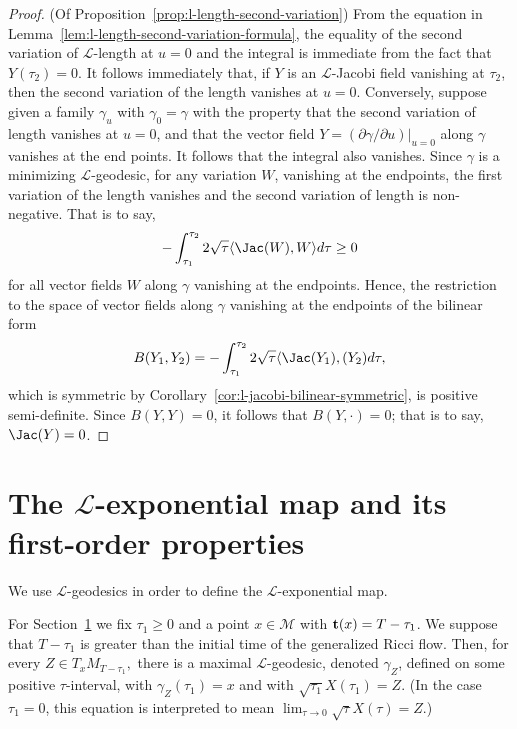 \begin{proof}(Of Proposition~\ref{prop:l-length-second-variation})
From the equation in Lemma~\ref{lem:l-length-second-variation-formula}, the equality of the second variation
of ${\mathcal L}$-length at $u=0$ and the integral is immediate from the fact
that $Y(\tau_2)=0$. It follows immediately that, if  $Y$ is an ${\mathcal
L}$-Jacobi field vanishing at $\tau_2$, then the second variation of the length
vanishes at $u=0$. Conversely, suppose given a family $\gamma_u$ with
$\gamma_0=\gamma$ with the property that the second variation of length
vanishes at $u=0$, and that the vector field $Y=(\partial\gamma/\partial
u)|_{u=0}$ along $\gamma$ vanishes at the end points. It follows that the
integral also vanishes. Since $\gamma$ is a minimizing ${\mathcal L}$-geodesic,
for any variation $W$, vanishing at the endpoints, the first variation of the
length vanishes and the second variation of length is non-negative. That is to
say,
$$-\int_{\tau_1}^{\tau_2}2\sqrt{\tau}\langle \Jac(W),W\rangle d\tau\ge 0$$
for all vector fields $W$ along $\gamma$ vanishing at the endpoints.
Hence, the restriction to the space of vector fields along $\gamma$
vanishing at the endpoints of the bilinear form
$$B(Y_1,Y_2)=-\int_{\tau_1}^{\tau_2}2\sqrt{\tau}\langle
\Jac(Y_1),(Y_2)d\tau,$$ which is symmetric by Corollary~\ref{cor:l-jacobi-bilinear-symmetric}, is
positive semi-definite. Since $B(Y,Y)=0$, it follows that $B(Y,\cdot)=0$; that
is to say, $\Jac(Y)=0$.
\end{proof}


\section{The ${\mathcal L}$-exponential map and its first-order
properties}\label{sect:Lexp}

We use  ${\mathcal L}$-geodesics in order to define the ${\mathcal
L}$-exponential map.

For Section~\ref{sect:Lexp} we fix $\tau_1\ge 0$ and a point $x\in
{\mathcal M}$ with ${\bf t}(x)=T-\tau_1$. We suppose that $T-\tau_1$
is greater than the initial time of the generalized Ricci flow.
Then, for every $Z \in T_{x}M_{T-\tau_1},$ there is a maximal
$\mathcal{L}$-geodesic, denoted $\gamma_{Z}$, defined on some
positive $\tau$-interval, with $\gamma_{Z}(\tau_1)=x$ and with
$\sqrt{\tau_1}X(\tau_1)=Z$. (In the case $\tau_1=0$, this equation
is interpreted to mean $\lim_{\tau\rightarrow 0} \sqrt{\tau}X(\tau)
= Z$.)

